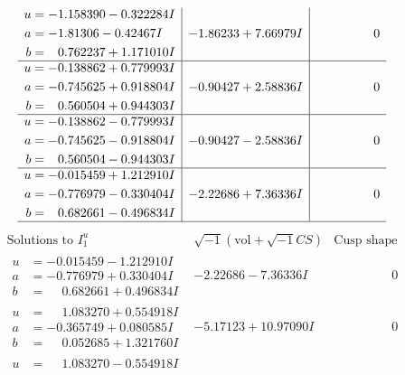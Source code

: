 \documentclass[1p]{elsarticle_modified}
\theoremstyle{definition}
\newcommand{\I}{\sqrt{-1}}
\begin{document}
$$\begin{array}{c|c|c}
\begin{aligned}
u &= -1.158390 - 0.322284 I \\
a &= -1.81306 - 0.42467 I \\
b &= \phantom{-}0.762237 + 1.171010 I\end{aligned}
 & -1.86233 + 7.66979 I & \phantom{-0.000000 } 0 \\ \hline\begin{aligned}
u &= -0.138862 + 0.779993 I \\
a &= -0.745625 + 0.918804 I \\
b &= \phantom{-}0.560504 + 0.944303 I\end{aligned}
 & -0.90427 + 2.58836 I & \phantom{-0.000000 } 0 \\ \hline\begin{aligned}
u &= -0.138862 - 0.779993 I \\
a &= -0.745625 - 0.918804 I \\
b &= \phantom{-}0.560504 - 0.944303 I\end{aligned}
 & -0.90427 - 2.58836 I & \phantom{-0.000000 } 0 \\ \hline\begin{aligned}
u &= -0.015459 + 1.212910 I \\
a &= -0.776979 - 0.330404 I \\
b &= \phantom{-}0.682661 - 0.496834 I\end{aligned}
 & -2.22686 + 7.36336 I & \phantom{-0.000000 } 0\\
 \hline 
 \end{array}$$\newpage$$\begin{array}{c|c|c}  
\text{Solutions to }I^u_{1}& \I (\text{vol} + \sqrt{-1}CS) & \text{Cusp shape}\\
 \hline 
\begin{aligned}
u &= -0.015459 - 1.212910 I \\
a &= -0.776979 + 0.330404 I \\
b &= \phantom{-}0.682661 + 0.496834 I\end{aligned}
 & -2.22686 - 7.36336 I & \phantom{-0.000000 } 0 \\ \hline\begin{aligned}
u &= \phantom{-}1.083270 + 0.554918 I \\
a &= -0.365749 + 0.080585 I \\
b &= \phantom{-}0.052685 + 1.321760 I\end{aligned}
 & -5.17123 + 10.97090 I & \phantom{-0.000000 } 0 \\ \hline\begin{aligned}
u &= \phantom{-}1.083270 - 0.554918 I \\

\end{aligned}
\end{array}$$
\end{document}
